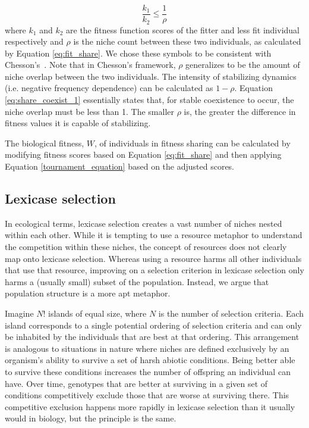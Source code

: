 \begin{equation}
\frac{k_1}{k_2} \leq \frac{1}{\rho}
\label{eq:share_coexist_1}
\end{equation}
where $k_1$ and $k_2$ are the fitness function scores of the fitter and less fit individual respectively and $\rho$ is the niche count between these two individuals, as calculated by Equation \ref{eq:fit_share}. We chose these symbols to be consistent with Chesson's~\cite{chesson_mechanisms_2000}. Note that in Chesson's framework, $\rho$ generalizes to be the amount of niche overlap between the two individuals. The intensity of stabilizing dynamics (i.e. negative frequency dependence) can be calculated as $1-\rho$. Equation \ref{eq:share_coexist_1} essentially states that, for stable coexistence to occur, the niche overlap must be less than 1. The smaller $\rho$ is, the greater the difference in fitness values it is capable of stabilizing.

The biological fitness, $W$, of individuals in fitness sharing can be calculated by modifying fitness scores based on Equation \ref{eq:fit_share} and then applying Equation \ref{tournament_equation} based on the adjusted scores.

\subsection{Lexicase selection}

In ecological terms, lexicase selection creates a vast number of niches nested within each other. While it is tempting to use a resource metaphor to understand the competition within these niches, the concept of resources does not clearly map onto lexicase selection. Whereas using a resource harms all other individuals that use that resource, improving on a selection criterion in lexicase selection only harms a (usually small) subset of the population. Instead, we argue that population structure is a more apt metaphor.%

Imagine $N!$ islands of equal size, where $N$ is the number of selection criteria. Each island corresponds to a single potential ordering of selection criteria and can only be inhabited by the individuals that are best at that ordering. This arrangement is analogous to situations in nature where niches are defined exclusively by an organism's ability to survive a set of harsh abiotic conditions. Being better able to survive these conditions increases the number of offspring an individual can have. Over time, genotypes that are better at surviving in a given set of conditions competitively exclude those that are worse at surviving there. This competitive exclusion happens more rapidly in lexicase selection than it usually would in biology, but the principle is the same. 

